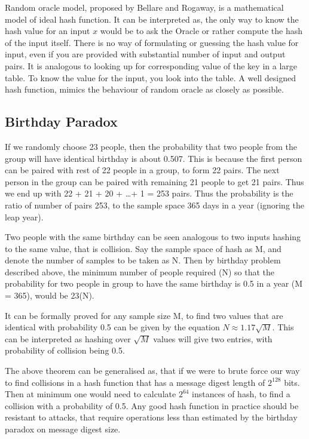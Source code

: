   Random oracle model, proposed by Bellare and Rogaway, is a mathematical model of ideal hash function.
  It can be interpreted as, the only way to know the hash value for an input $x$ would be to
  ask the Oracle or rather compute the hash of the input itself. There is no way of formulating or 
  guessing the hash value for input, even if you are provided with substantial number of input and output
  pairs. It is analogous to looking up for corresponding value of the key in a large table. To know the
  value for the input, you look into the table. A well designed hash function, mimics the behaviour of
  random oracle as closely as possible. 

  \subsection{ Birthday Paradox }
  If we randomly choose 23 people, then the probability that two people from the group will have identical
  birthday is about 0.507. This is because the first person can be paired with rest of 22 people in a group,
  to form 22 pairs. The next person in the group can be paired with remaining 21 people to get 21 pairs. Thus 
  we end up with 22 + 21 + 20 + \ldots + 1 = 253 pairs. Thus the probability is the ratio of number of pairs 253,
  to the sample space 365 days in a year (ignoring the leap year).

  Two people with the same birthday can be seen analogous to two inputs hashing to the same value, that is 
  collision. Say the sample space of hash as M, and denote the number of samples to be taken as N. Then 
  by birthday problem described above, the minimum number of people required (N) so that the probability for
  two people in group to have the same birthday is 0.5 in a year (M = 365), would be 23(N).

  It can be formally proved for any sample size M, to find two values that are identical with probability
  0.5 can be given by the equation $N \approx 1.17 \sqrt{M}$. This can be interpreted as hashing over $\sqrt{M}$
  values will give two entries, with probability of collision being 0.5.

  The above theorem can be generalised as, that if we were to brute force our way to find collisions in
  a hash function that has a message digest length of $2^{128}$ bits. Then at minimum one would need to 
  calculate $2^{64}$ instances of hash, to find a collision with a probability of 0.5. Any good hash function 
  in practice should be resistant to attacks, that require operations less than estimated by the birthday 
  paradox on message digest size.


